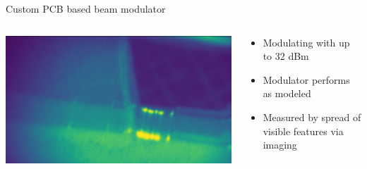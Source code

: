 \documentclass[final]{beamer}
\begin{document}
\begin{frame}[fragile]{}
\begin{columns}[T]
\begin{column}{.49\linewidth}
\begin{block}{\Large Custom PCB based beam modulator}
\begin{columns}
\begin{column}{0.45\columnwidth}
				\includegraphics[width=0.49\columnwidth]{./figures/kickertest02.png}
			\end{column}
			\begin{column}{0.45\columnwidth}
				\begin{itemize}
					\item Modulating with up to 32 dBm 
					\item Modulator performs as modeled
					\item Measured by spread of visible features via imaging
				\end{itemize}
			\end{column}
		\end{columns}
	\end{block}


\end{column}
\end{columns}
\end{frame}
\end{document}
